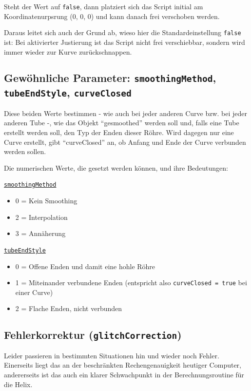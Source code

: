\documentclass[12pt,a4paper]{scrartcl}
\begin{document}
Steht der Wert auf \texttt{false}, dann platziert sich das Script
initial am Koordinatenurpsrung (0, 0, 0) und kann danach frei verschoben
werden.

Daraus leitet sich auch der Grund ab, wieso hier die Standardeinstellung
\texttt{false} ist: Bei aktivierter Justierung ist das Script nicht
frei verschiebbar, sondern wird immer wieder zur Kurve zurückschnappen.

\subsection{Gewöhnliche Parameter: \texttt{smoothingMethod}, \texttt{tubeEndStyle}, \texttt{curveClosed}}
Diese beiden Werte bestimmen - wie auch bei jeder anderen Curve bzw.
bei jeder anderen Tube -, wie das Objekt ``gesmoothed'' werden soll
und, falls eine Tube erstellt werden soll, den Typ der Enden dieser Röhre.
Wird dagegen nur eine Curve erstellt, gibt ``curveClosed'' an, ob Anfang
und Ende der Curve verbunden werden sollen.

\pagebreak

Die numerischen Werte, die gesetzt werden können, und ihre Bedeutungen:

\underline{\texttt{smoothingMethod}}
\begin{itemize}
	\item 0 = Kein Smoothing
	\item 2 = Interpolation
	\item 3 = Annäherung
\end{itemize}

\underline{\texttt{tubeEndStyle}}
\begin{itemize}
	\item 0 = Offene Enden und damit eine hohle Röhre
	\item 1 = Miteinander verbundene Enden (entspricht also
		\texttt{curveClosed = true} bei einer Curve)
	\item 2 = Flache Enden, nicht verbunden
\end{itemize}

\subsection{Fehlerkorrektur (\texttt{glitchCorrection})}
Leider passieren in bestimmten Situationen hin und wieder noch Fehler. Einerseits
liegt das an der beschränkten Rechengenauigkeit heutiger Computer, andererseits
ist das auch ein klarer Schwachpunkt in der Berechnungsroutine für die Helix.
\end{document}

